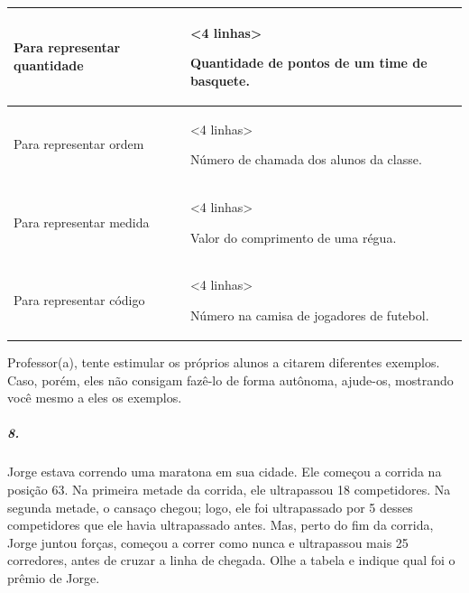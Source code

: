 \begin{longtable}[]{@{}ll@{}}
\toprule
\begin{minipage}[b]{0.48\columnwidth}\raggedright\strut
Para representar quantidade\strut
\end{minipage} & \begin{minipage}[b]{0.48\columnwidth}\raggedright\strut
\textless{}4 linhas\textgreater{}

Quantidade de pontos de um time de basquete.\strut
\end{minipage}\tabularnewline
\midrule
\endhead
\begin{minipage}[t]{0.48\columnwidth}\raggedright\strut
Para representar ordem\strut
\end{minipage} & \begin{minipage}[t]{0.48\columnwidth}\raggedright\strut
\textless{}4 linhas\textgreater{}

Número de chamada dos alunos da classe.\strut
\end{minipage}\tabularnewline
\begin{minipage}[t]{0.48\columnwidth}\raggedright\strut
Para representar medida\strut
\end{minipage} & \begin{minipage}[t]{0.48\columnwidth}\raggedright\strut
\textless{}4 linhas\textgreater{}

Valor do comprimento de uma régua.\strut
\end{minipage}\tabularnewline
\begin{minipage}[t]{0.48\columnwidth}\raggedright\strut
Para representar código\strut
\end{minipage} & \begin{minipage}[t]{0.48\columnwidth}\raggedright\strut
\textless{}4 linhas\textgreater{}

Número na camisa de jogadores de futebol.\strut
\end{minipage}\tabularnewline
\bottomrule
\end{longtable}

Professor(a), tente estimular os próprios alunos a citarem diferentes exemplos. Caso, porém, eles não consigam fazê-lo de forma autônoma, ajude-os, mostrando você mesmo a eles os exemplos.

\subparagraph{8. }\label{section-7}

Jorge estava correndo uma maratona em sua cidade. Ele começou a corrida
na posição 63. Na primeira metade da corrida, ele ultrapassou 18
competidores. Na segunda metade, o cansaço chegou; logo, ele foi
ultrapassado por 5 desses competidores que ele havia ultrapassado antes.
Mas, perto do fim da corrida, Jorge juntou forças, começou a correr como
nunca e ultrapassou mais 25 corredores, antes de cruzar a linha de
chegada. Olhe a tabela e indique qual foi o prêmio de Jorge.

